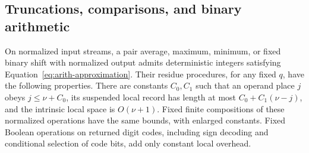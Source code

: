 \subsection{Truncations, comparisons, and binary arithmetic}

\begin{lemma}
\label{lem:arith-elementary}
On normalized input streams, a pair average, maximum, minimum, or
fixed binary shift with normalized output admits deterministic integers
satisfying Equation~\eqref{eq:arith-approximation}.  Their residue
procedures, for any fixed $q$, have the following properties.  There
are constants $C_0,C_1$ such that an operand place $j$ obeys
$j\leq \nu+C_0$, its suspended local record has length at most
$C_0+C_1(\nu-j)$, and the intrinsic local space is $O(\nu+1)$.
Fixed finite compositions of these normalized operations have the
same bounds, with enlarged constants.  Fixed Boolean operations on
returned digit codes, including sign decoding and conditional selection
of code bits, add only constant local overhead.
\end{lemma}

